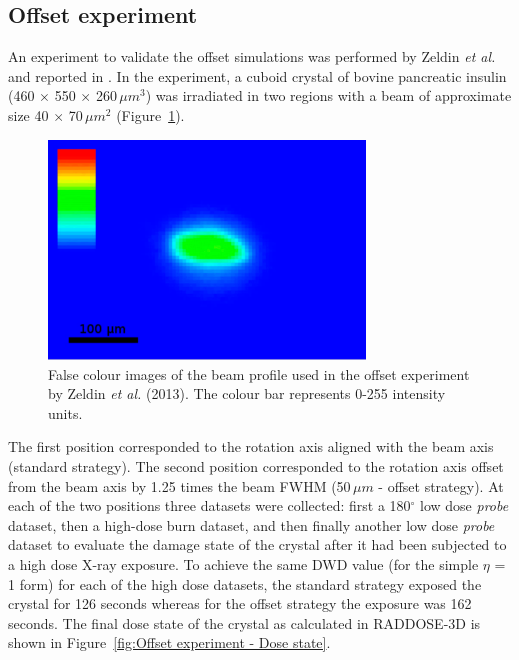 \subsection{Offset experiment}
\label{sub:Offset Experiment}
An experiment to validate the offset simulations was performed by Zeldin \textit{et al.} and reported in \cite{zeldin2013dwd}.
In the experiment, a cuboid crystal of bovine pancreatic insulin (460 $\times$ 550 $\times$ 260$\,\mu m^3$) was irradiated in two regions with a beam of approximate size 40 $\times$ 70$\,\mu m^2$ (Figure~\ref{fig:Offset experiment - Beam}).
\begin{figure}
  \centering
    \includegraphics[width=0.75\textwidth]{figures/dwd/Oli_offset_exp_beam.png}
    \caption[Beam profile used in the offset experiment described in Zeldin \textit{et al.} (2013).]{False colour images of the beam profile used in the offset experiment by Zeldin \textit{et al.} (2013). The colour bar represents 0-255 intensity units.}
    \label{fig:Offset experiment - Beam}
\end{figure}
The first position corresponded to the rotation axis aligned with the beam axis (standard strategy).
The second position corresponded to the rotation axis offset from the beam axis by 1.25 times the beam FWHM (50$\,\mu m$ - offset strategy).
At each of the two positions three datasets were collected: first a 180$^{\circ}$ low dose \textit{probe} dataset, then a high-dose burn dataset, and then finally another low dose \textit{probe} dataset to evaluate the damage state of the crystal after it had been subjected to a high dose X-ray exposure.
To achieve the same DWD value (for the simple $\eta$ = 1 form) for each of the high dose datasets, the standard strategy exposed the crystal for 126 seconds whereas for the offset strategy the exposure was 162 seconds.
The final dose state of the crystal as calculated in RADDOSE-3D is shown in Figure~\ref{fig:Offset experiment - Dose state}.
